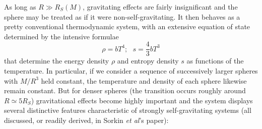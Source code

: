 \documentclass[12pt]{article}
\newcommand{\be}{\begin{equation}}
\newcommand{\ee}{\end{equation}}
\begin{document}
As long as $R \gg R_S(M)$, gravitating effects are fairly insignificant and the sphere may be treated as if it were non-self-gravitating. It then behaves as a pretty conventional thermodynamic system, with an extensive equation of state determined by the intensive formulae
\be\label{EMstate}
\rho=bT^4;\,\,\,\, s=\frac{4}{3}b T^3
\ee
that determine the energy density $\rho$ and entropy density $s$ as functions of the temperature. In particular, if we consider a sequence of successively larger spheres with $M/R^3$ held constant, the temperature and density of each sphere likewise remain constant. But for denser spheres (the transition occurs roughly around $R\simeq 5 R_S$) gravitational effects become highly important and the system displays several distinctive features characteristic of strongly self-gravitating systems (all discussed, or readily derived, in Sorkin \emph{et al}'s paper):
\end{document}
